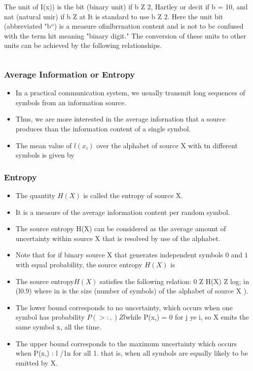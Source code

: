 \documentclass[a4]{beamer}
\begin{document}
\begin{frame}
The unit of I(x)) is the bit (binary unit) if b Z 2, Hartley or decit if b = 10, and nat (natural unir) if
b Z at It is standard to use b Z 2. Here the unit bit (abbreviated "b“) is a measure ofinlbrrnation
content and is not to bc confused with the term hit meaning "binary digit." The conversion of these
units to other units can be achieved by the following relationships.

\[   \]
\end{frame}
\begin{frame}
\frametitle{Average Information or Entropy}
\begin{itemize}
\item In a practical communication system, we usually transmit long sequences of symbols from an
information source. \item Thus, we are more interested in the average infornation that a source produces
than the information content of a single symbol.
\item The mean value of $ l(x_i)$ over the alphabet of source X with tn different symbols is given by
\[ \]
\end{itemize}
\end{frame}
\begin{frame}
\frametitle{Entropy}
\begin{itemize}
\item The quantity $H(X)$ is called the entropy of source X. \item It is a measure of the average information content per random symbol. 
\item The source entropy H(X) can be considered as the average amount of uncertainty
within source X that is resolved by use of the alphabet.

\item Note that for if  binary source X that generates independent symbols $0$ and $1$ with equal probability, the source entropy $H(X)$ is
\item The source entropy$ H(X)$ satisfies the following relation:
0 Z H(X) Z log; in (l0.9) where in is the size (number of symbols) of the alphabet of source X ). 
\item  The lower bound corresponds to no uncertainty, which occurs when one symbol has probability $P(>:,)Zl $while 
P(x,) = 0 for j ye i, so X emits the same symbol x, all the time. \item The upper bound corresponds to the maximum uncertainty which occurs when P(x,) : l /1n for all 1. that is, when all symbols are equally likely to be emitted by X.
 \end{itemize}
\end{frame}
\end{document}

